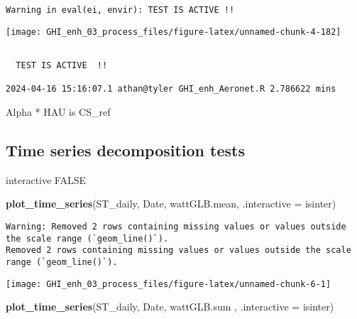 \documentclass[
  10pt,
  a4paper,oneside]{article}
\newenvironment{Shaded}{\begin{snugshade}}{\end{snugshade}}
\newcommand{\AttributeTok}[1]{\textcolor[rgb]{0.13,0.29,0.53}{#1}}
\newcommand{\FunctionTok}[1]{\textcolor[rgb]{0.13,0.29,0.53}{\textbf{#1}}}
\newcommand{\NormalTok}[1]{#1}
\begin{document}
\begin{verbatim}
Warning in eval(ei, envir): TEST IS ACTIVE !!
\end{verbatim}

\begin{center}\texttt{[image: GHI\_enh\_03\_process\_files/figure-latex/unnamed-chunk-4-182]} \end{center}

\begin{verbatim}

  TEST IS ACTIVE  !! 

2024-04-16 15:16:07.1 athan@tyler GHI_enh_Aeronet.R 2.786622 mins
\end{verbatim}

Alpha * HAU is CS\_ref

\hypertarget{time-series-decomposition-tests}{%
\subsection{Time series decomposition tests}\label{time-series-decomposition-tests}}

interactive FALSE

\begin{Shaded}
\begin{Highlighting}[]
\FunctionTok{plot\_time\_series}\NormalTok{(ST\_daily, Date, wattGLB.mean, }\AttributeTok{.interactive =}\NormalTok{ isinter)}
\end{Highlighting}
\end{Shaded}

\begin{verbatim}
Warning: Removed 2 rows containing missing values or values outside the scale range (`geom_line()`).
Removed 2 rows containing missing values or values outside the scale range (`geom_line()`).
\end{verbatim}

\begin{center}\texttt{[image: GHI\_enh\_03\_process\_files/figure-latex/unnamed-chunk-6-1]} \end{center}

\begin{Shaded}
\begin{Highlighting}[]
\FunctionTok{plot\_time\_series}\NormalTok{(ST\_daily, Date, wattGLB.sum , }\AttributeTok{.interactive =}\NormalTok{ isinter)}
\end{Highlighting}
\end{Shaded}
\end{document}

